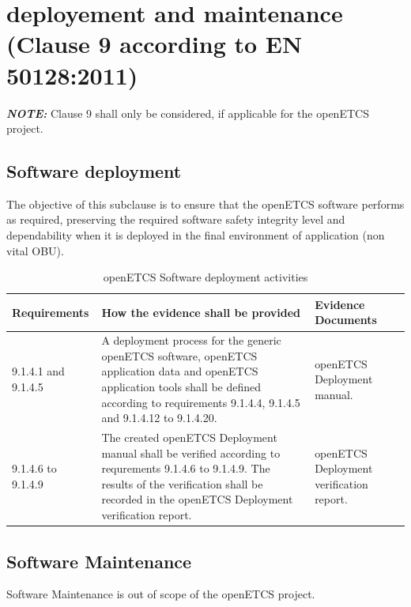 \documentclass{template/openetcs_report}
\begin{document}
\section{deployement and maintenance (Clause 9 according to EN 50128:2011)}
\label{clause92}
\begin{flushleft}
\textit{\textbf{NOTE: }}
Clause 9 shall only be considered, if applicable for the openETCS project.
\end{flushleft}

\subsection{Software deployment}
\begin{flushleft}
The objective of this subclause is to ensure that the openETCS software performs as required, preserving the required software safety integrity level and dependability when it is deployed in the final environment of application (non vital OBU).
\end{flushleft}
{\footnotesize\sffamily\centering
\begin{longtable}{|p{2cm}|p{9cm}|p{3cm}|}
\caption{openETCS Software deployment activities}\\
\hline
\bfseries Requirements & \bfseries How the evidence shall be provided & \bfseries Evidence Documents\\
\hline
\hline
\endhead
\hline
\endfoot

9.1.4.1 and 9.1.4.5 & A deployment process for the generic openETCS software, openETCS application data and openETCS application tools shall be defined according to requirements 9.1.4.4, 9.1.4.5 and 9.1.4.12 to 9.1.4.20. & openETCS Deployment manual.\\ 
\hline
9.1.4.6 to 9.1.4.9 & The created openETCS Deployment manual shall be verified according to requrements 9.1.4.6 to 9.1.4.9.
The results of the verification shall be recorded in the openETCS Deployment verification report. & openETCS Deployment verification report.\\ 
\hline
\end{longtable}}



\subsection{Software Maintenance}
Software Maintenance is out of scope of the openETCS project.
\end{document}
